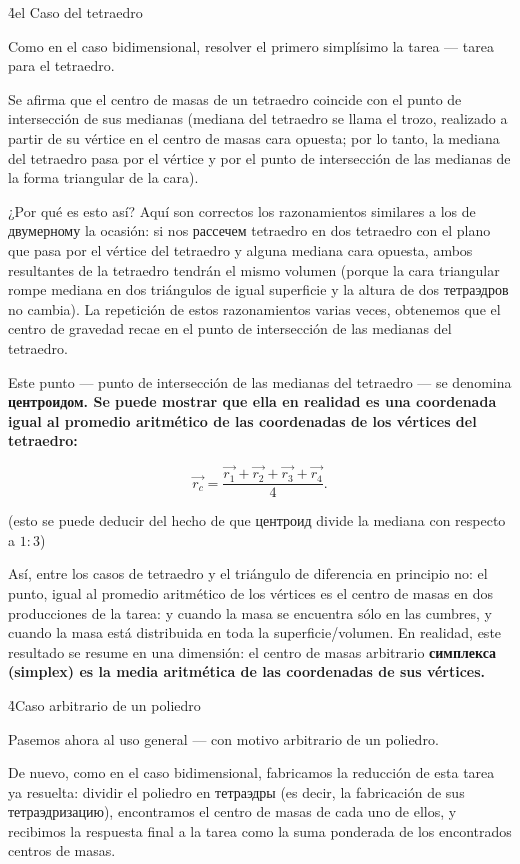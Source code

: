 \h4{el Caso del tetraedro}

Como en el caso bidimensional, resolver el primero simplísimo la tarea --- tarea para el tetraedro.

Se afirma que el centro de masas de un tetraedro coincide con el punto de intersección de sus medianas (mediana del tetraedro se llama el trozo, realizado a partir de su vértice en el centro de masas cara opuesta; por lo tanto, la mediana del tetraedro pasa por el vértice y por el punto de intersección de las medianas de la forma triangular de la cara).

¿Por qué es esto así? Aquí son correctos los razonamientos similares a los de двумерному la ocasión: si nos рассечем tetraedro en dos tetraedro con el plano que pasa por el vértice del tetraedro y alguna mediana cara opuesta, ambos resultantes de la tetraedro tendrán el mismo volumen (porque la cara triangular rompe mediana en dos triángulos de igual superficie y la altura de dos тетраэдров no cambia). La repetición de estos razonamientos varias veces, obtenemos que el centro de gravedad recae en el punto de intersección de las medianas del tetraedro.

Este punto --- punto de intersección de las medianas del tetraedro --- se denomina \bf{центроидом}. Se puede mostrar que ella en realidad es una coordenada igual al promedio aritmético de las coordenadas de los vértices del tetraedro:

$$ \vec{r_c} = \frac{ \vec{r_1} + \vec{r_2} + \vec{r_3} + \vec{r_4} }{ 4 }. $$

(esto se puede deducir del hecho de que центроид divide la mediana con respecto a $1:3$)

Así, entre los casos de tetraedro y el triángulo de diferencia en principio no: el punto, igual al promedio aritmético de los vértices es el centro de masas en dos producciones de la tarea: y cuando la masa se encuentra sólo en las cumbres, y cuando la masa está distribuida en toda la superficie/volumen. En realidad, este resultado se resume en una dimensión: el centro de masas arbitrario \bf{симплекса} (simplex) es la media aritmética de las coordenadas de sus vértices.

\h4{Caso arbitrario de un poliedro}

Pasemos ahora al uso general --- con motivo arbitrario de un poliedro.

De nuevo, como en el caso bidimensional, fabricamos la reducción de esta tarea ya resuelta: dividir el poliedro en тетраэдры (es decir, la fabricación de sus тетраэдризацию), encontramos el centro de masas de cada uno de ellos, y recibimos la respuesta final a la tarea como la suma ponderada de los encontrados centros de masas.

